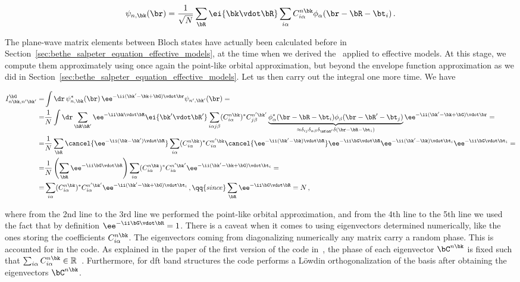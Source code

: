 \begin{equation}
    \label{eq:Bloch_state_LCAO_repeated}
    \psi_{n, \bk} (\br) = \frac{1}{\sqrt{N}} \sum_{\bR} \ei{\bk \vdot \bR} \sum_{i \alpha} C_{i \alpha}^{n \bk} \phi_{\alpha} (\br - \bR - \bt_i)\,.
\end{equation}

\noindent The plane-wave matrix elements between Bloch states have actually been calculated before in Section~\ref{sec:bethe_salpeter_equation_effective_models}, at the time when we derived the \bse~applied to effective models.
At this stage, we compute them approximately using once again the point-like orbital approximation, but beyond the envelope function approximation as we did in Section~\ref{sec:bethe_salpeter_equation_effective_models}.
Let us then carry out the integral one more time.
We have

\begin{align}
    \label{eq:plane_wave_matrix_element}
    I^{\bG}_{n \bk, n' \bk'} =& \int \dr\, \psi^*_{n,\bk} (\br)\, \ee^{-\ii(\bk' - \bk + \bG) \vdot \br} \psi_{n', \bk'} (\br) = \notag \\
    =& \frac{1}{N} \int \dr \sum_{\bR \bR'} \ee^{- \ii \bk \vdot \bR} \ei{\bk' \vdot \bR'} \sum_{i \alpha j \beta} (C_{i \alpha}^{n \bk})^* C_{j \beta}^{n' \bk'} \underbrace{\phi^*_{\alpha} (\br - \bR - \bt_i) \phi_{\beta} (\br - \bR' - \bt_j)}_{\approx \delta_{ij} \delta_{\alpha \beta} \delta_{\bR \bR'} \delta(\br - \bR - \bt_i)} \ee^{-\ii(\bk' - \bk + \bG) \vdot \br} = \notag \\
    =& \frac{1}{N} \sum_{\bR} \cancel{\ee^{-\ii (\bk - \bk') \vdot \bR}} \sum_{i \alpha} (C_{i \alpha}^{n \bk})^* C_{i \alpha}^{n' \bk} \cancel{\ee^{-\ii (\bk' - \bk) \vdot \bR}} \ee^{- \ii \bG \vdot \bR} \ee^{- \ii (\bk' - \bk)  \vdot \bt_i} \ee^{-\ii \bG  \vdot \bt_i} =  \notag \\
    =& \frac{1}{N} \left(\sum_{\bR} \ee^{-\ii \bG \vdot \bR} \right) \sum_{i \alpha} (C_{i \alpha}^{n \bk})^* C_{i \alpha}^{n' \bk'}  \ee^{-\ii (\bk' - \bk + \bG)  \vdot \bt_i} = \notag \\
    =& \sum_{i \alpha} (C_{i \alpha}^{n \bk})^* C_{i \alpha}^{n' \bk'}  \ee^{-\ii (\bk' - \bk + \bG)  \vdot \bt_i}\,, \qq{since} \sum_{\bR} \ee^{-\ii \bG \vdot \bR} = N \,,
\end{align}

\noindent where from the 2nd line to the 3rd line we performed the point-like orbital approximation, and from the 4th line to the 5th line we used the fact that by definition $\ee^{-\ii \bG \vdot \bR} = 1$.
There is a caveat when it comes to using eigenvectors determined numerically, like the ones storing the coefficients $C_{i \alpha}^{n \bk}$.
The eigenvectors coming from diagonalizing numerically any matrix carry a random phase.
This is accounted for in the code.
As explained in the paper of the first version of the code in~\cite{Xatu}, the phase of each eigenvector $\bC^{n \bk}$ is fixed such that $\sum_{i \alpha} C_{i \alpha}^{n \bk} \in \mathbb{R}$~\cite{Louie_2000}.
Furthermore, for \gls{dft} band structures the code performs a L\"owdin orthogonalization of the basis after obtaining the eigenvectors $\bC^{n \bk}$.

